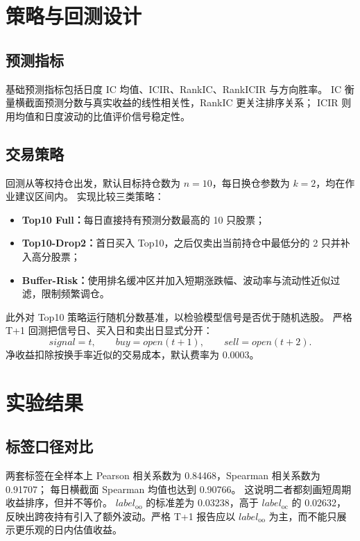 \documentclass[UTF8,a4paper,11pt]{ctexart}
\begin{document}
\section{策略与回测设计}

\subsection{预测指标}

基础预测指标包括日度 IC 均值、ICIR、RankIC、RankICIR 与方向胜率。
IC 衡量横截面预测分数与真实收益的线性相关性，RankIC 更关注排序关系；
ICIR 则用均值和日度波动的比值评价信号稳定性。

\subsection{交易策略}

回测从等权持仓出发，默认目标持仓数为 $n=10$，每日换仓参数为 $k=2$，均在作业建议区间内。
实现比较三类策略：
\begin{itemize}
  \item \textbf{Top10 Full：}每日直接持有预测分数最高的 10 只股票；
  \item \textbf{Top10-Drop2：}首日买入 Top10，之后仅卖出当前持仓中最低分的 2 只并补入高分股票；
  \item \textbf{Buffer-Risk：}使用排名缓冲区并加入短期涨跌幅、波动率与流动性近似过滤，限制频繁调仓。
\end{itemize}
此外对 Top10 策略运行随机分数基准，以检验模型信号是否优于随机选股。
严格 T+1 回测把信号日、买入日和卖出日显式分开：
\[
signal=t,\qquad buy=open(t+1),\qquad sell=open(t+2).
\]
净收益扣除按换手率近似的交易成本，默认费率为 0.0003。

\section{实验结果}

\subsection{标签口径对比}

两套标签在全样本上 Pearson 相关系数为 0.84468，Spearman 相关系数为 0.91707；
每日横截面 Spearman 均值也达到 0.90766。
这说明二者都刻画短周期收益排序，但并不等价。
$label_{\mathrm{oo}}$ 的标准差为 0.03238，高于 $label_{\mathrm{oc}}$ 的 0.02632，
反映出跨夜持有引入了额外波动。严格 T+1 报告应以 $label_{\mathrm{oo}}$ 为主，而不能只展示更乐观的日内估值收益。
\end{document}
